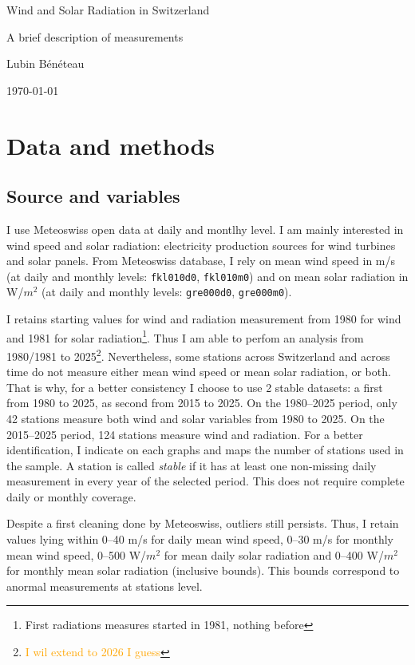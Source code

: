 \documentclass[11pt,a4paper]{article}
\begin{document}
\begin{center}
{\LARGE Wind and Solar Radiation in Switzerland\par}
\vspace{0.4em}
{\large A brief description of measurements\par}
\vspace{0.4em}
{\small Lubin Bénéteau\par}
\vspace{0.4em}
{\today}
\end{center}

\section{Data and methods}
\subsection{Source and variables}

I use Meteoswiss open data at daily and montlhy level. I am mainly interested in wind speed and solar radiation: electricity production sources for wind turbines and solar panels. From Meteoswiss database, I rely on mean wind speed in m/s (at daily and monthly levels:  \texttt{fkl010d0}, \texttt{fkl010m0}) and on mean solar radiation in W/$m^2$ (at daily and monthly levels:  \texttt{gre000d0}, \texttt{gre000m0}). 

I retains starting values for wind and radiation measurement from 1980 for wind and 1981 for solar radiation\footnote{First radiations measures started in 1981, nothing before}. Thus I am able to perfom an analysis from 1980/1981 to 2025\footnote{\textcolor{orange}{I wil extend to 2026 I guess}}. Nevertheless, some stations across Switzerland and across time do not measure either mean wind speed or mean solar radiation, or both. That is why, for a better consistency I choose to use 2 stable datasets: a first from 1980 to 2025, as second from 2015 to 2025. On the 1980--2025 period, only 42 stations measure both wind and solar variables from 1980 to 2025. On the 2015--2025 period, 124 stations measure wind and radiation. For a better identification, I indicate on each graphs and maps the number of stations used in the sample. A station is called \textit{stable} if it has at least one non-missing daily measurement in every year of the selected period. This does not require complete daily or monthly coverage.

Despite a first cleaning done by Meteoswiss, outliers still persists. Thus, I retain values lying within 0--40 m/s for daily mean wind speed, 0--30 m/s for monthly mean wind speed, 0--500 W/$m^2$ for mean daily solar radiation and 0--400 W/$m^2$ for monthly mean solar radiation (inclusive bounds). This bounds correspond to anormal measurements at stations level.
\end{document}
